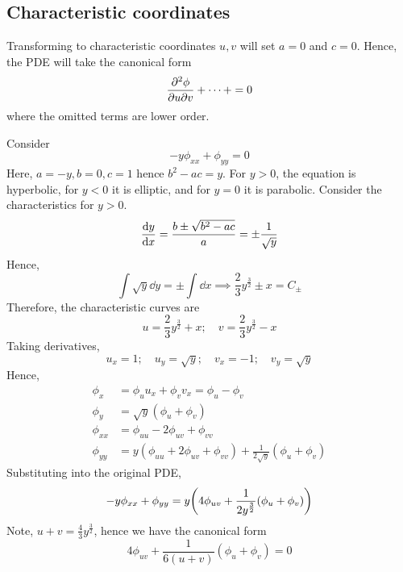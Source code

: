 \documentclass[a4paper]{article}
\begin{document}
\subsection{Characteristic coordinates}
Transforming to characteristic coordinates \( u,v \) will set \( a = 0 \) and \( c = 0 \).
Hence, the PDE will take the canonical form
\[
	\pdv{\phi}{u}{v} + \dots + = 0
\]
where the omitted terms are lower order.
\begin{example}
	Consider
	\[
		-y \phi_{xx} + \phi_{yy} = 0
	\]
	Here, \( a = -y, b = 0, c = 1 \) hence \( b^2 - ac = y \).
	For \( y > 0 \), the equation is hyperbolic, for \( y < 0 \) it is elliptic, and for \( y = 0 \) it is parabolic.
	Consider the characteristics for \( y > 0 \).
	\[
		\dv{y}{x} = \frac{b \pm \sqrt{b^2 - ac}}{a} = \pm \frac{1}{\sqrt{y}}
	\]
	Hence,
	\[
		\int \sqrt{y} \dd{y} = \pm \int \dd{x} \implies \frac{2}{3} y^{\frac{3}{2}} \pm x = C_\pm
	\]
	Therefore, the characteristic curves are
	\[
		u = \frac{2}{3} y^{\frac{3}{2}} + x;\quad v = \frac{2}{3} y^{\frac{3}{2}} - x
	\]
	Taking derivatives,
	\[
		u_x = 1;\quad u_y = \sqrt{y};\quad v_x = -1;\quad v_y = \sqrt{y}
	\]
	Hence,
	\begin{align*}
		\phi_x    & = \phi_u u_x + \phi_v v_x = \phi_u - \phi_v                                      \\
		\phi_y    & = \sqrt{y} (\phi_u + \phi_v)                                                     \\
		\phi_{xx} & = \phi_{uu} - 2 \phi_{uv} + \phi_{vv}                                            \\
		\phi_{yy} & = y (\phi_{uu} + 2 \phi_{uv} + \phi_{vv}) + \frac{1}{2\sqrt{y}}(\phi_u + \phi_v)
	\end{align*}
	Substituting into the original PDE,
	\[
		-y \phi_{xx} + \phi_{yy} = y\qty(4 \phi_{uv} + \frac{1}{2y^{\frac{3}{2}}} (\phi_u + \phi_v) )
	\]
	Note, \( u + v = \frac{4}{3} y^{\frac{3}{2}} \), hence we have the canonical form
	\[
		4 \phi_{uv} + \frac{1}{6(u+v)} (\phi_u + \phi_v) = 0
	\]
\end{example}
\end{document}
